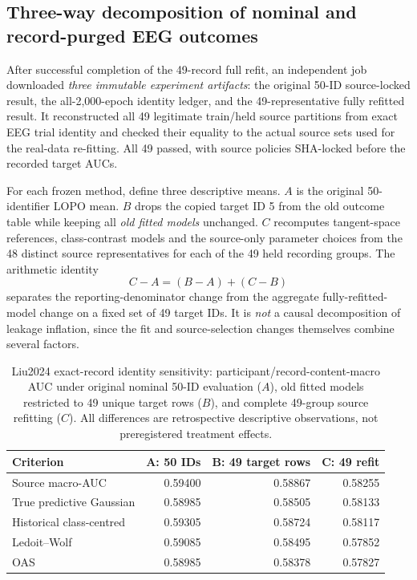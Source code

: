 \subsection{Three-way decomposition of nominal and record-purged EEG outcomes}
\label{sec:v28-three-estimands}
After successful completion of the 49-record full refit, an
independent job downloaded \emph{three immutable experiment
artifacts}: the original 50-ID source-locked result, the
all-2,000-epoch identity ledger, and the 49-representative
fully refitted result. It reconstructed all 49 legitimate
train/held source partitions from exact EEG trial identity
and checked their equality to the actual source sets used
for the real-data re-fitting. All 49 passed, with source
policies SHA-locked before the recorded target AUCs.

For each frozen method, define three descriptive means.
$A$ is the original 50-identifier LOPO mean. $B$ drops
the copied target ID 5 from the old outcome table while
keeping all \emph{old fitted models} unchanged. $C$
recomputes tangent-space references, class-contrast
models and the source-only parameter choices from the
48 distinct source representatives for each of the 49
held recording groups. The arithmetic identity
\[
 C-A=(B-A)+(C-B)
\]
separates the reporting-denominator change from
the aggregate fully-refitted-model change on a
fixed set of 49 target IDs. It is \emph{not} a
causal decomposition of leakage inflation, since
the fit and source-selection changes themselves
combine several factors.

\begin{table}[tb]
\centering\small
\caption{Liu2024 exact-record identity sensitivity:
participant/record-content-macro AUC under original nominal
50-ID evaluation ($A$), old fitted models restricted
to 49 unique target rows ($B$), and complete 49-group
source refitting ($C$). All differences are retrospective
descriptive observations, not preregistered treatment effects.}
\label{tab:v28-three-estimands}
\begin{tabular}{lrrr}
\toprule
Criterion & A: 50 IDs & B: 49 target rows & C: 49 refit\\
\midrule
Source macro-AUC & 0.59400 & 0.58867 & 0.58255\\
True predictive Gaussian & 0.58985 & 0.58505 & 0.58133\\
Historical class-centred & 0.59305 & 0.58724 & 0.58117\\
Ledoit--Wolf & 0.59085 & 0.58495 & 0.57852\\
OAS & 0.58985 & 0.58378 & 0.57827\\
\bottomrule
\end{tabular}
\end{table}

